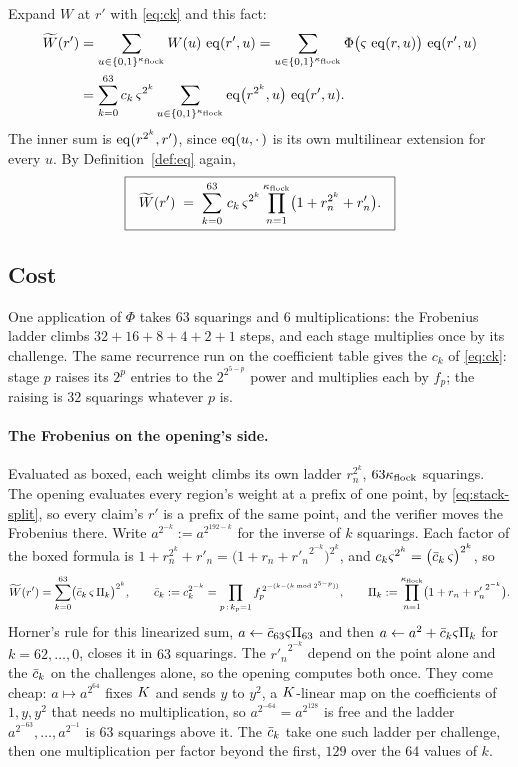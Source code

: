 Expand $W$ at $r'$ with \eqref{eq:ck} and this fact:
\[
\begin{aligned}
\widetilde{W}(r')&=\sum_{u\in\{0,1\}^{\kappa_{\mathrm{flock}}}}W(u)\,\operatorname{eq}(r',u)
=\sum_{u\in\{0,1\}^{\kappa_{\mathrm{flock}}}}\Phi\bigl(\varsigma\,\operatorname{eq}(r,u)\bigr)\,\operatorname{eq}(r',u)\\
&=\sum_{k=0}^{63}c_k\,\varsigma^{2^k}\sum_{u\in\{0,1\}^{\kappa_{\mathrm{flock}}}}\operatorname{eq}\bigl(r^{2^k},u\bigr)\,\operatorname{eq}(r',u).
\end{aligned}
\]
The inner sum is $\operatorname{eq}(r^{2^k},r')$, since $\operatorname{eq}(u,\cdot\,)$ is its own multilinear extension for every $u$. By Definition~\ref{def:eq} again,
\[
\boxed{\ \
\widetilde{W}(r') \;=\; \sum_{k=0}^{63}\, c_k\,\varsigma^{2^k} \prod_{n=1}^{\kappa_{\mathrm{flock}}}
\bigl( 1 + r_n^{2^k} + r'_n \bigr).
\ \ }
\]

\subsection{Cost}\label{rs:cost}

One application of $\Phi$ takes $63$ squarings and $6$ multiplications: the Frobenius ladder climbs $32+16+8+4+2+1$ steps, and each stage multiplies once by its challenge. The same recurrence run on the coefficient table gives the $c_k$ of \eqref{eq:ck}: stage $p$ raises its $2^p$ entries to the $2^{2^{5-p}}$ power and multiplies each by $f_p$; the raising is $32$ squarings whatever $p$ is.

\paragraph{The Frobenius on the opening's side.} Evaluated as boxed, each weight climbs its own ladder $r_n^{2^k}$, $63\kappa_{\mathrm{flock}}$ squarings. The opening evaluates every region's weight at a prefix of one point, by \eqref{eq:stack-split}, so every claim's $r'$ is a prefix of the same point, and the verifier moves the Frobenius there. Write $a^{2^{-k}}:=a^{2^{192-k}}$ for the inverse of $k$ squarings. Each factor of the boxed formula is $1+r_n^{2^k}+r'_n=\bigl(1+r_n+{r'_n}^{2^{-k}}\bigr)^{2^k}$, and $c_k\varsigma^{2^k}=\bigl(\bar c_k\,\varsigma\bigr)^{2^k}$, so
\[
\widetilde{W}(r')=\sum_{k=0}^{63}\bigl(\bar c_k\,\varsigma\,\Pi_k\bigr)^{2^k},
\qquad
\bar c_k:=c_k^{2^{-k}}=\prod_{p\,:\,k_p=1}f_p^{\,2^{-(k-(k\bmod 2^{5-p}))}},
\qquad
\Pi_k:=\prod_{n=1}^{\kappa_{\mathrm{flock}}}\bigl(1+r_n+{r'_n}^{2^{-k}}\bigr).
\]
Horner's rule for this linearized sum, $a\leftarrow\bar c_{63}\varsigma\Pi_{63}$ and then $a\leftarrow a^2+\bar c_k\varsigma\Pi_k$ for $k=62,\dots,0$, closes it in $63$ squarings. The ${r'_n}^{2^{-k}}$ depend on the point alone and the $\bar c_k$ on the challenges alone, so the opening computes both once. They come cheap: $a\mapsto a^{2^{64}}$ fixes $K$ and sends $y$ to $y^2$, a $K$-linear map on the coefficients of $1,y,y^2$ that needs no multiplication, so $a^{2^{-64}}=a^{2^{128}}$ is free and the ladder $a^{2^{-63}},\dots,a^{2^{-1}}$ is $63$ squarings above it. The $\bar c_k$ take one such ladder per challenge, then one multiplication per factor beyond the first, $129$ over the $64$ values of $k$.

